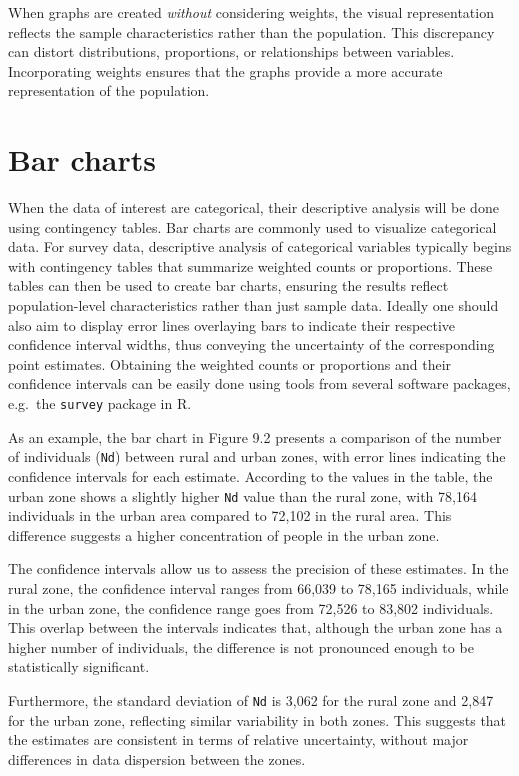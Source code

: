 \documentclass[
  12pt,
]{book}
\begin{document}
When graphs are created \emph{without} considering weights, the visual representation reflects the sample characteristics rather than the population. This discrepancy can distort distributions, proportions, or relationships between variables. Incorporating weights ensures that the graphs provide a more accurate representation of the population.

\hypertarget{bar-charts}{%
\section{Bar charts}\label{bar-charts}}

When the data of interest are categorical, their descriptive analysis will be done using contingency tables. Bar charts are commonly used to visualize categorical data. For survey data, descriptive analysis of categorical variables typically begins with contingency tables that summarize weighted counts or proportions. These tables can then be used to create bar charts, ensuring the results reflect population-level characteristics rather than just sample data. Ideally one should also aim to display error lines overlaying bars to indicate their respective confidence interval widths, thus conveying the uncertainty of the corresponding point estimates. Obtaining the weighted counts or proportions and their confidence intervals can be easily done using tools from several software packages, e.g.~the \texttt{survey} package in R.

As an example, the bar chart in Figure 9.2 presents a comparison of the number of individuals (\texttt{Nd}) between rural and urban zones, with error lines indicating the confidence intervals for each estimate. According to the values in the table, the urban zone shows a slightly higher \texttt{Nd} value than the rural zone, with 78,164 individuals in the urban area compared to 72,102 in the rural area. This difference suggests a higher concentration of people in the urban zone.

The confidence intervals allow us to assess the precision of these estimates. In the rural zone, the confidence interval ranges from 66,039 to 78,165 individuals, while in the urban zone, the confidence range goes from 72,526 to 83,802 individuals. This overlap between the intervals indicates that, although the urban zone has a higher number of individuals, the difference is not pronounced enough to be statistically significant.

Furthermore, the standard deviation of \texttt{Nd} is 3,062 for the rural zone and 2,847 for the urban zone, reflecting similar variability in both zones. This suggests that the estimates are consistent in terms of relative uncertainty, without major differences in data dispersion between the zones.
\end{document}
